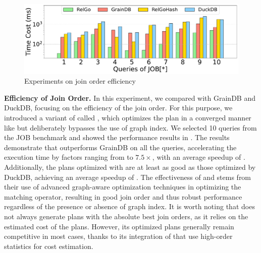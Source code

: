 \begin{figure}[ht]
    \centering
    \includegraphics[width=\linewidth]{./figures/exp/hash_plan_job.pdf}
    \caption{Experiments on join order efficiency}
    \label{fig:exp-hash-plan}
\end{figure}

\noindent\textbf{Efficiency of Join Order.}
In this experiment, we compared \name with GrainDB and DuckDB, focusing on the efficiency of the join order. For this purpose, we introduced a variant of \name called \relgohash, which optimizes the plan in a converged manner like \name but deliberately bypasses the use of graph index. We selected 10 queries from the JOB benchmark and showed the performance results in .
The results demonstrate that \name outperforms GrainDB on all the queries, accelerating the execution time by factors ranging from \revise{$1.4\times$} to $7.5\times$, with an average speedup of \revise{$4.14\times$}. Additionally, the plans optimized with \relgohash are at least as good as those optimized by DuckDB, achieving an average speedup of \revise{$1.6\times$}. The effectiveness of \name and \relgohash stems from their use of advanced graph-aware optimization techniques in optimizing the matching operator, resulting in good join order and thus robust performance regardless of the presence or absence of graph index.
It is worth noting that \name does not always generate plans with the absolute best join orders, as it relies on the estimated cost of the plans. However, its optimized plans generally remain competitive in most cases, thanks to its integration of \glogue that use high-order statistics for cost estimation.




